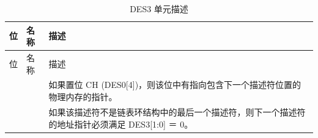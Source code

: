 \begin{longtable}[c]{ |p{3cm}|p{4cm}|p{8cm}| }
\caption{DES3 单元描述} \label{tab:sdhost-DES3}\\
\hline
{}
位 &名称 & 描述 \\
\hline
\endfirsthead
\hline
{}
位 &名称 & 描述  \\
\hline
\endhead
\endfoot
{}& & 如果置位 CH (DES0[4])，则该位中有指向包含下一个描述符位置的物理内存的指针。\\
&&如果该描述符不是链表环结构中的最后一个描述符，则下一个描述符的地址指针必须满足 DES3[1:0] ＝ 0。\\\hline
\end{longtable}